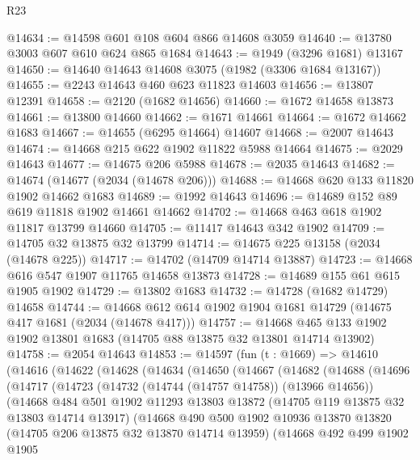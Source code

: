 \begin{lexlean}{R23}
\begin{coremodule}
@14634 := @14598 @601 @108 @604 @866 @14608 @3059
@14640 := @13780 @3003 @607 @610 @624 @865 @1684
@14643 := @1949 (@3296 @1681) @13167
@14650 := @14640 @14643 @14608 @3075 (@1982 (@3306 @1684 @13167))
@14655 := @2243 @14643 @460 @623 @11823 @14603
@14656 := @13807 @12391
@14658 := @2120 (@1682 @14656)
@14660 := @1672 @14658 @13873
@14661 := @13800 @14660
@14662 := @1671 @14661
@14664 := @1672 @14662 @1683
@14667 := @14655 (@6295 @14664) @14607
@14668 := @2007 @14643
@14674 := @14668 @215 @622 @1902 @11822 @5988 @14664
@14675 := @2029 @14643
@14677 := @14675 @206 @5988
@14678 := @2035 @14643
@14682 := @14674 (@14677 (@2034 (@14678 @206)))
@14688 := @14668 @620 @133 @11820 @1902 @14662 @1683
@14689 := @1992 @14643
@14696 := @14689 @152 @89 @619 @11818 @1902 @14661 @14662
@14702 := @14668 @463 @618 @1902 @11817 @13799 @14660
@14705 := @11417 @14643 @342 @1902
@14709 := @14705 @32 @13875 @32 @13799
@14714 := @14675 @225 @13158 (@2034 (@14678 @225))
@14717 := @14702 (@14709 @14714 @13887)
@14723 := @14668 @616 @547 @1907 @11765 @14658 @13873
@14728 := @14689 @155 @61 @615 @1905 @1902
@14729 := @13802 @1683
@14732 := @14728 (@1682 @14729) @14658
@14744 := @14668 @612 @614 @1902 @1904 @1681 @14729 (@14675 @417 @1681 (@2034 (@14678 @417)))
@14757 := @14668 @465 @133 @1902 @1902 @13801 @1683 (@14705 @88 @13875 @32 @13801 @14714 @13902)
@14758 := @2054 @14643
@14853 := @14597
    (fun (t : @1669) =>
    @14610
      (@14616
        (@14622
          (@14628
            (@14634
              (@14650
                (@14667
                  (@14682
                    (@14688
                      (@14696
                        (@14717
                          (@14723
                            (@14732 (@14744 (@14757 @14758)) (@13966 @14656))
                            (@14668
                              @484
                              @501
                              @1902
                              @11293
                              @13803
                              @13872
                              (@14705 @119 @13875 @32 @13803 @14714 @13917)
                              (@14668
                                @490
                                @500
                                @1902
                                @10936
                                @13870
                                @13820
                                (@14705 @206 @13875 @32 @13870 @14714 @13959)
                                (@14668
                                  @492
                                  @499
                                  @1902
                                  @1905

\end{coremodule}
\end{lexlean}
